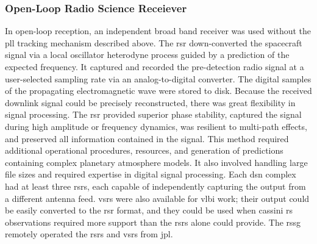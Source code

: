 \documentclass{article}
\begin{document}
            \subsubsection{%
                \footnotesize{Open-Loop Radio Science Receiever}
            }
                \label{subsubsec:usr_open_loop_rad_sci_rec}
                In \gls{open-loop} reception, an independent broad
                band receiver was used without the \gls{pll}
                tracking mechanism described above. The \gls{rsr}
                down-converted the spacecraft signal via a local
                \gls{oscillator} \gls{heterodyne} process guided
                by a prediction of the expected \gls{frequency}.
                It captured and recorded the pre-detection radio
                signal at a user-selected \gls{sampling rate} via
                an \gls{analog-to-digital converter}. The digital
                samples of the propagating electromagnetic wave
                were stored to disk. Because the received
                \gls{downlink} signal could be precisely
                reconstructed, there was great flexibility in
                signal processing. The \gls{rsr} provided superior
                \gls{phase stability}, captured the signal during
                high \gls{amplitude} or \gls{frequency} dynamics,
                was resilient to \glspl{multi-path effect}, and
                preserved all information contained in the signal.
                This method required additional operational
                procedures, resources, and generation of
                predictions containing complex planetary
                atmosphere models. It also involved handling
                large file sizes and required expertise in
                digital signal processing. Each \gls{dsn}
                complex had at least three \glspl{rsr},
                each capable of independently capturing the
                output from a different antenna feed.
                \glspl{vsr} were also available for \gls{vlbi}
                work; their output could be easily converted to
                the \gls{rsr} format, and they could be used when
                \gls{cassini} \gls{rs} observations required more
                support than the \glspl{rsr} alone could provide.
                The \gls{rssg} remotely operated the \glspl{rsr}
                and \gls{vsr}s from \gls{jpl}.
\end{document}
